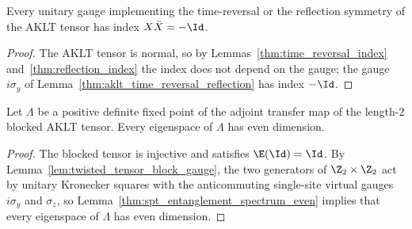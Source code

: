 \begin{lemma}
    \label{thm:aklt_time_reversal_reflection_index}
    \leanok
    Every unitary gauge implementing the time-reversal or the reflection symmetry
    of the AKLT tensor has index $X\bar X=-\Id$.
\end{lemma}
\begin{proof}
    \leanok
    The AKLT tensor is normal, so by Lemmas~\ref{thm:time_reversal_index}
    and~\ref{thm:reflection_index} the index does not depend on the gauge; the
    gauge $i\sigma_y$ of Lemma~\ref{thm:aklt_time_reversal_reflection} has index
    $-\Id$.
\end{proof}

\begin{lemma}
    \label{thm:aklt_entanglement_spectrum_even}
    \leanok
    Let $\Lambda$ be a positive definite fixed point of the adjoint transfer map
    of the length-$2$ blocked AKLT tensor.  Every eigenspace of $\Lambda$ has
    even dimension.
\end{lemma}
\begin{proof}
    \leanok
    The blocked tensor is injective and satisfies $\E(\Id)=\Id$. By
    Lemma~\ref{lem:twisted_tensor_block_gauge}, the two generators of
    $\Z_2\times\Z_2$ act by unitary Kronecker squares with the anticommuting
    single-site virtual gauges $i\sigma_y$ and $\sigma_z$, so
    Lemma~\ref{thm:spt_entanglement_spectrum_even} implies that every
    eigenspace of $\Lambda$ has even dimension.
\end{proof}

